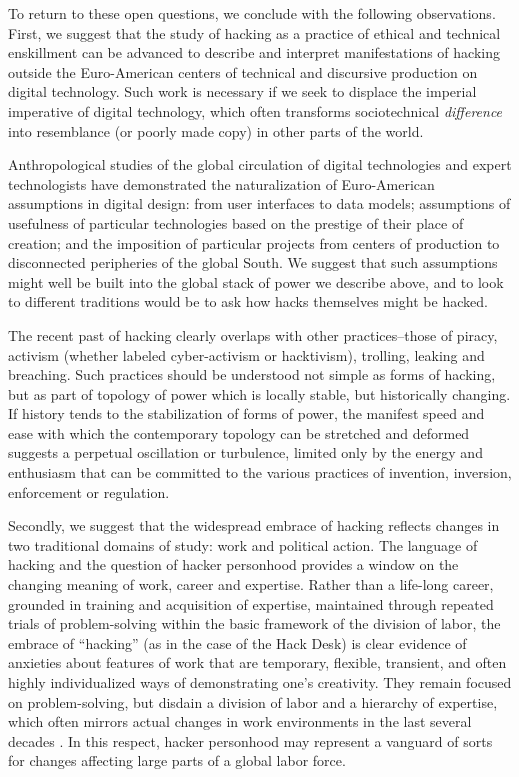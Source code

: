 \documentclass[10pt,letter,oneside]{scrartcl}
\begin{document}
To return to these open questions, we conclude with the following observations.
First, we suggest that the study of hacking as a practice of ethical and
technical enskillment can be advanced to describe and interpret manifestations
of hacking outside the Euro-American centers of technical and discursive
production on digital technology.  Such work is necessary if we seek to displace the
imperial imperative of digital technology, which often transforms sociotechnical
\emph{difference} into resemblance (or poorly made copy) in other parts of the
world.

Anthropological studies of the global circulation of digital
technologies and expert technologists have demonstrated the naturalization of
Euro-American assumptions in digital design: from user interfaces to data
models; assumptions of usefulness of particular technologies based on the
prestige of their place of creation; and the imposition of particular projects
from centers of production to disconnected peripheries of the global
South\cite{chan_networking_2013,takhteyev_coding_2012,xiang_2007}.  We suggest
that such assumptions might well be built into the global stack of power we
describe above,  and to look to different traditions would be to ask how hacks
themselves might be hacked.

The recent past of hacking clearly overlaps with other practices--those of 
piracy, activism (whether labeled cyber-activism or hacktivism), trolling, 
leaking and breaching.  Such practices should be understood not simple as 
forms of hacking, but as part of topology of power which is locally stable, 
but historically changing.  If history tends to the stabilization of forms 
of power, the manifest speed and ease with which the contemporary topology 
can be stretched and deformed suggests a perpetual oscillation or turbulence, 
limited only by the energy and enthusiasm that can be committed to the various 
practices of invention, inversion, enforcement or regulation.

Secondly, we suggest that the widespread embrace of hacking reflects changes in
two traditional domains of study: work and political action.  The language of
hacking and the question of hacker personhood provides a window on the changing
meaning of work, career and expertise.  Rather than a life-long career, grounded
in training and acquisition of expertise, maintained through repeated trials of
problem-solving within the basic framework of the division of labor, the embrace
of ``hacking'' (as in the case of the Hack Desk) is clear evidence of anxieties
about features of work that are temporary, flexible, transient, and often highly
individualized ways of demonstrating one's creativity.  They remain focused on
problem-solving, but disdain a division of labor and a hierarchy of expertise,
which often mirrors actual changes in work environments in the last several
decades \parencite{Boltanski2005}.  In this respect, hacker personhood may
represent a vanguard of sorts for changes affecting large parts of a global
labor force.
\end{document}
